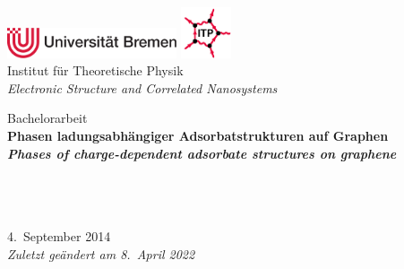 \documentclass[a4paper, 10pt, twoside, openany]{book} %
\begin{document}
\frontmatter


\begin{titlepage}
    \centering

    \normalsize
    \includegraphics[width=5cm]{Abbildungen/Uni.pdf} \hfill \includegraphics[height=1.5cm]{Abbildungen/ITP.pdf} \\
    \hfill Institut für Theoretische Physik \\
    \hfill \emph{Electronic Structure and Correlated Nanosystems}

    \vfill

    \Large
    Bachelorarbeit \\[3pc]

    \bf \Huge
    Phasen ladungsabhängiger Adsorbatstrukturen auf Graphen \\[3pc]

    \it \normalsize
    Phases of charge-dependent adsorbate structures on graphene

    \vfill

    \normalfont \large
    \hspace{0cm}\hspace{1pc} \\[1pc]
    \hspace{0cm}\hspace{1pc} \\
    \hspace{0cm}\hspace{1pc} \\[2pc]

    4.~September 2014 \\[6pt]

    \normalsize \it
    Zuletzt geändert am 8.~April 2022

    \vfill
\end{titlepage}


\tableofcontents
\end{document}
